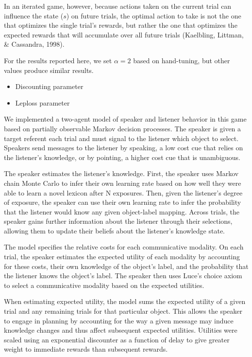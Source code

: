 \documentclass[10pt, letterpaper]{article}
\begin{document}
In an iterated game, however, because actions taken on the current trial
can influence the state (\(s\)) on future trials, the optimal action to
take is not the one that optimizes the single trial's rewards, but
rather the one that optimizes the expected rewards that will accumulate
over all future trials (Kaelbling, Littman, \& Cassandra, 1998).

For the results reported here, we set \(\alpha = 2\) based on
hand-tuning, but other values produce similar results.

\begin{itemize}
\tightlist
\item
  Discounting parameter
\item
  Leploss parameter
\end{itemize}

We implemented a two-agent model of speaker and listener behavior in
this game based on partially observable Markov decision processes. The
speaker is given a target referent each trial and must signal to the
listener which object to select. Speakers send messages to the listener
by speaking, a low cost cue that relies on the listener's knowledge, or
by pointing, a higher cost cue that is unambiguous.

The speaker estimates the listener's knowledge. First, the speaker uses
Markov chain Monte Carlo to infer their own learning rate based on how
well they were able to learn a novel lexicon after N exposures. Then,
given the listener's degree of exposure, the speaker can use their own
learning rate to infer the probability that the listener would know any
given object-label mapping. Across trials, the speaker gains further
information about the listener through their selections, allowing them
to update their beliefs about the listener's knowledge state.

The model specifies the relative costs for each communicative modality.
On each trial, the speaker estimates the expected utility of each
modality by accounting for these costs, their own knowledge of the
object's label, and the probability that the listener knows the object's
label. The speaker then uses Luce's choice axiom to select a
communicative modality based on the expected utilities.

When estimating expected utility, the model sums the expected utility of
a given trial and any remaining trials for that particular object. This
allows the speaker to engage in planning by accounting for the way a
given message may induce knowledge changes and thus affect subsequent
expected utilities. Utilities were scaled using an exponential
discounter as a function of delay to give greater weight to immediate
rewards than subsequent rewards.
\end{document}
